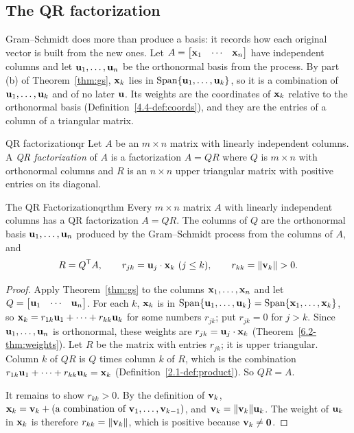 \documentclass[11pt]{article}
\begin{document}
\subsection*{The QR factorization}

Gram--Schmidt does more than produce a basis: it records how each original vector is built from the new ones. Let $A=\begin{bmatrix}\mathbf{x}_1&\cdots&\mathbf{x}_n\end{bmatrix}$ have independent columns and let $\mathbf{u}_1,\dots,\mathbf{u}_n$ be the orthonormal basis from the process. By part (b) of Theorem~\ref{thm:gs}, $\mathbf{x}_k$ lies in $\operatorname{Span}\{\mathbf{u}_1,\dots,\mathbf{u}_k\}$, so it is a combination of $\mathbf{u}_1,\dots,\mathbf{u}_k$ and of no later $\mathbf{u}$. Its weights are the coordinates of $\mathbf{x}_k$ relative to the orthonormal basis (Definition~\ref{4.4-def:coords}), and they are the entries of a column of a triangular matrix.

\begin{defn}{QR factorization}{qr}
Let $A$ be an $m\times n$ matrix with linearly independent columns. A \emph{QR factorization} of $A$ is a factorization $A=QR$ where $Q$ is $m\times n$ with orthonormal columns and $R$ is an $n\times n$ upper triangular matrix with positive entries on its diagonal.
\end{defn}

\begin{thm}{The QR Factorization}{qrthm}
Every $m\times n$ matrix $A$ with linearly independent columns has a QR factorization $A=QR$. The columns of $Q$ are the orthonormal basis $\mathbf{u}_1,\dots,\mathbf{u}_n$ produced by the Gram--Schmidt process from the columns of $A$, and
\[
R=Q^{\mathsf T} A,\qquad r_{jk}=\mathbf{u}_j\cdot\mathbf{x}_k\ (j\le k),\qquad r_{kk}=\lVert\mathbf{v}_k\rVert>0 .
\]
\end{thm}

\begin{proof}
Apply Theorem~\ref{thm:gs} to the columns $\mathbf{x}_1,\dots,\mathbf{x}_n$ and let $Q=\begin{bmatrix}\mathbf{u}_1&\cdots&\mathbf{u}_n\end{bmatrix}$. For each $k$, $\mathbf{x}_k$ is in $\operatorname{Span}\{\mathbf{u}_1,\dots,\mathbf{u}_k\}=\operatorname{Span}\{\mathbf{x}_1,\dots,\mathbf{x}_k\}$, so $\mathbf{x}_k=r_{1k}\mathbf{u}_1+\cdots+r_{kk}\mathbf{u}_k$ for some numbers $r_{jk}$; put $r_{jk}=0$ for $j>k$. Since $\mathbf{u}_1,\dots,\mathbf{u}_n$ is orthonormal, these weights are $r_{jk}=\mathbf{u}_j\cdot\mathbf{x}_k$ (Theorem~\ref{6.2-thm:weights}). Let $R$ be the matrix with entries $r_{jk}$; it is upper triangular. Column $k$ of $QR$ is $Q$ times column $k$ of $R$, which is the combination $r_{1k}\mathbf{u}_1+\cdots+r_{kk}\mathbf{u}_k=\mathbf{x}_k$ (Definition~\ref{2.1-def:product}). So $QR=A$.

It remains to show $r_{kk}>0$. By the definition of $\mathbf{v}_k$, $\mathbf{x}_k=\mathbf{v}_k+(\text{a combination of }\mathbf{v}_1,\dots,\mathbf{v}_{k-1})$, and $\mathbf{v}_k=\lVert\mathbf{v}_k\rVert\mathbf{u}_k$. The weight of $\mathbf{u}_k$ in $\mathbf{x}_k$ is therefore $r_{kk}=\lVert\mathbf{v}_k\rVert$, which is positive because $\mathbf{v}_k\neq\mathbf{0}$.
\end{proof}
\end{document}
